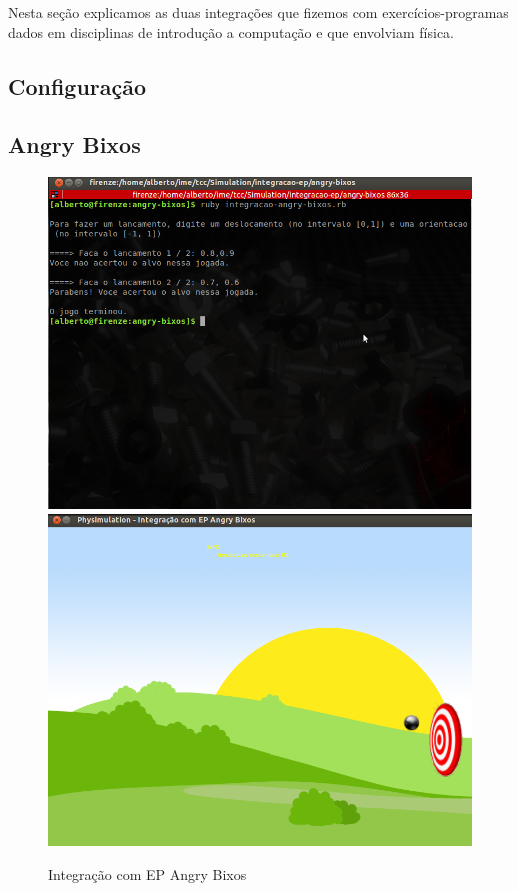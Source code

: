 Nesta seção explicamos as duas integrações que fizemos com exercícios-programas dados em disciplinas de introdução a computação e que envolviam física.

\subsection{Configuração}
\subsection{Angry Bixos}

\begin{figure}[H]
    \centering
	\includegraphics[scale=0.3]{images/angry-bixos-2.png}
	\includegraphics[scale=0.3]{images/angry-bixos.png}
	\caption{Integração com EP Angry Bixos}
\end{figure}

